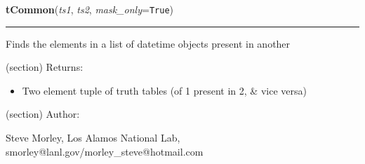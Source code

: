     \label{spacepy:toolbox:tCommon}

    \vspace{0.5ex}

\hspace{.8\funcindent}\begin{boxedminipage}{\funcwidth}

    \raggedright \textbf{tCommon}(\textit{ts1}, \textit{ts2}, \textit{mask\_only}={\tt True})

    \vspace{-1.5ex}

    \rule{\textwidth}{0.5\fboxrule}
\setlength{\parskip}{2ex}
    Finds the elements in a list of datetime objects present in another

    (section) Returns:

      \begin{itemize}
      \setlength{\parskip}{0.6ex}
        \item Two element tuple of truth tables (of 1 present in 2, \& vice 
          versa)

      \end{itemize}

    (section) Author:

      Steve Morley, Los Alamos National Lab, 
      smorley@lanl.gov/morley\_steve@hotmail.com

\setlength{\parskip}{1ex}
    \end{boxedminipage}

    \label{spacepy:toolbox:loadpickle}

    \vspace{0.5ex}


